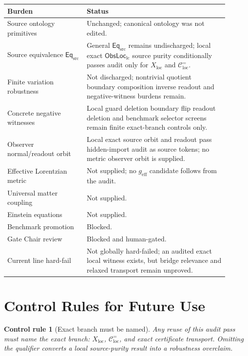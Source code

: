 \documentclass[11pt]{article}
\newcommand{\EqSrc}{\mathsf{Eq}_{\mathrm{src}}}
\newcommand{\ObsLocLC}{\mathsf{ObsLoc}_{\mathrm{lc}}}
\newcommand{\geff}{g_{\mathrm{eff}}}
\newtheorem{controlrule}{Control rule}
\begin{document}
\begin{center}
\small
\begin{tabular}{p{0.32\linewidth}p{0.58\linewidth}}
\hline
Burden & Status \\
\hline
Source ontology primitives & Unchanged; canonical ontology was not edited. \\
Source equivalence \(\EqSrc\) & General \(\EqSrc\) remains undischarged; local exact \(\ObsLocLC\) source purity conditionally passes audit only for \(X_{\mathrm{loc}}\) and \(\mathcal{C}^{=}_{\mathrm{loc}}\). \\
Finite variation robustness & Not discharged; nontrivial quotient boundary composition inverse readout and negative-witness burdens remain. \\
Concrete negative witnesses & Local guard deletion boundary flip readout deletion and benchmark selector screens remain finite exact-branch controls only. \\
Observer normal/readout orbit & Local exact source orbit and readout pass hidden-import audit as source tokens; no metric observer orbit is supplied. \\
Effective Lorentzian metric & Not supplied; no \(\geff\) candidate follows from the audit. \\
Universal matter coupling & Not supplied. \\
Einstein equations & Not supplied. \\
Benchmark promotion & Blocked. \\
Gate Chair review & Blocked and human-gated. \\
Current line hard-fail & Not globally hard-failed; an audited exact local witness exists, but bridge relevance and relaxed transport remain unproved. \\
\hline
\end{tabular}
\end{center}

\section{Control Rules for Future Use}

\begin{controlrule}[Exact branch must be named]
Any reuse of this audit pass must name the exact branch:
\(X_{\mathrm{loc}}\), \(\mathcal{C}^{=}_{\mathrm{loc}}\), and exact
certificate transport. Omitting the qualifier converts a local
source-purity result into a robustness overclaim.
\end{controlrule}
\end{document}
